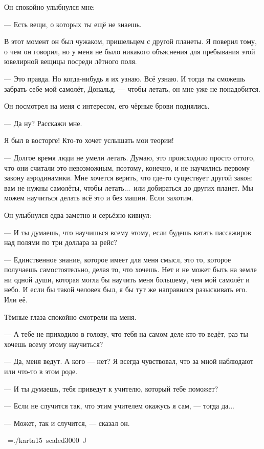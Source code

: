 Он спокойно улыбнулся мне:

--- Есть вещи, о которых ты ещё не знаешь.

В этот момент он был чужаком, пришельцем с другой планеты. Я поверил тому, о чем он говорил, но у меня не было никакого объяснения для пребывания этой ювелирной вещицы посреди лётного поля.

--- Это правда. Но когда-нибудь я их узнаю. Всё узнаю. И тогда ты сможешь забрать себе мой самолёт, Дональд, --- чтобы летать, он мне уже не понадобится.

Он посмотрел на меня с интересом, его чёрные брови поднялись.

--- Да ну? Расскажи мне.

Я был в восторге! Кто-то хочет услышать мои теории!

--- Долгое время люди не умели летать. Думаю, это происходило просто оттого, что они считали это
невозможным, поэтому, конечно, и не научились первому закону аэродинамики. Мне хочется верить,
что где-то существует другой закон: вам не нужны самолёты, чтобы летать...\ или добираться до
других планет. Мы можем научиться делать всё это и без машин. Если захотим.

Он улыбнулся едва заметно и серьёзно кивнул:

--- И ты думаешь, что научишься всему этому, если будешь катать пассажиров над полями по три доллара за рейс?

--- Единственное знание, которое имеет для меня смысл, это то, которое получаешь самостоятельно,
делая то, что хочешь. Нет и не может быть на земле ни одной души, которая могла бы научить меня
большему, чем мой самолёт и небо. И если бы такой человек был, я бы тут же направился разыскивать
его. Или её.

Тёмные глаза спокойно смотрели на меня.

--- А тебе не приходило в голову, что тебя на самом деле кто-то ведёт, раз ты хочешь всему этому научиться?

--- Да, меня ведут. А кого --- нет? Я всегда чувствовал, что за мной наблюдают или что-то в этом роде.

--- И ты думаешь, тебя приведут к учителю, который тебе поможет?

--- Если не случится так, что этим учителем окажусь я сам, --- тогда да...

--- Может, так и случится, --- сказал он.

\vskip28pt
\hbox{\kern7cm \font\karta=./karta15 scaled3000 \karta ^^4a}
\vskip15pt

